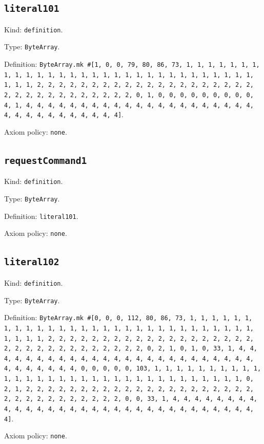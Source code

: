 \documentclass[11pt]{article}
\begin{document}
\subsection*{\texttt{literal101}}
\noindent Kind: \texttt{definition}.\par
\noindent Type: \texttt{ByteArray}.\par
\noindent Definition: \texttt{ByteArray.mk \#[1, 0, 0, 79, 80, 86, 73, 1, 1, 1, 1, 1, 1, 1, 1, 1, 1, 1, 1, 1, 1, 1, 1, 1, 1, 1, 1, 1, 1, 1, 1, 1, 1, 1, 1, 1, 1, 1, 1, 1, 2, 2, 2, 2, 2, 2, 2, 2, 2, 2, 2, 2, 2, 2, 2, 2, 2, 2, 2, 2, 2, 2, 2, 2, 2, 2, 2, 2, 2, 2, 2, 2, 0, 1, 0, 0, 0, 0, 0, 0, 0, 0, 0, 4, 1, 4, 4, 4, 4, 4, 4, 4, 4, 4, 4, 4, 4, 4, 4, 4, 4, 4, 4, 4, 4, 4, 4, 4, 4, 4, 4, 4, 4, 4, 4, 4, 4]}.\par
\noindent Axiom policy: \texttt{none}.\par
\subsection*{\texttt{requestCommand1}}
\noindent Kind: \texttt{definition}.\par
\noindent Type: \texttt{ByteArray}.\par
\noindent Definition: \texttt{literal101}.\par
\noindent Axiom policy: \texttt{none}.\par
\subsection*{\texttt{literal102}}
\noindent Kind: \texttt{definition}.\par
\noindent Type: \texttt{ByteArray}.\par
\noindent Definition: \texttt{ByteArray.mk \#[0, 0, 0, 112, 80, 86, 73, 1, 1, 1, 1, 1, 1, 1, 1, 1, 1, 1, 1, 1, 1, 1, 1, 1, 1, 1, 1, 1, 1, 1, 1, 1, 1, 1, 1, 1, 1, 1, 1, 1, 2, 2, 2, 2, 2, 2, 2, 2, 2, 2, 2, 2, 2, 2, 2, 2, 2, 2, 2, 2, 2, 2, 2, 2, 2, 2, 2, 2, 2, 2, 2, 2, 0, 2, 1, 0, 1, 0, 33, 1, 4, 4, 4, 4, 4, 4, 4, 4, 4, 4, 4, 4, 4, 4, 4, 4, 4, 4, 4, 4, 4, 4, 4, 4, 4, 4, 4, 4, 4, 4, 4, 4, 0, 0, 0, 0, 0, 103, 1, 1, 1, 1, 1, 1, 1, 1, 1, 1, 1, 1, 1, 1, 1, 1, 1, 1, 1, 1, 1, 1, 1, 1, 1, 1, 1, 1, 1, 1, 1, 1, 0, 2, 1, 2, 2, 2, 2, 2, 2, 2, 2, 2, 2, 2, 2, 2, 2, 2, 2, 2, 2, 2, 2, 2, 2, 2, 2, 2, 2, 2, 2, 2, 2, 2, 2, 0, 0, 33, 1, 4, 4, 4, 4, 4, 4, 4, 4, 4, 4, 4, 4, 4, 4, 4, 4, 4, 4, 4, 4, 4, 4, 4, 4, 4, 4, 4, 4, 4, 4, 4, 4]}.\par
\noindent Axiom policy: \texttt{none}.\par
\end{document}
